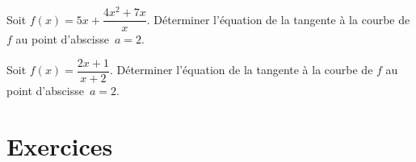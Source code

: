 \documentclass[10pt,a4paper,openany,twoside, eleve]{book}
\begin{document}
\begin{exon}
  Soit $f(x)\!=\!5x+\dfrac{4x^2+7x}{x}$.
  Déterminer l'équation de la tangente à la courbe de $f$ au point
  d'abscisse~$a\!=\!2$.

  \vspace{4mm}
\end{exon}


\begin{exon}
  Soit $f(x)\!=\!\dfrac{2x+1}{x+2}$.
  Déterminer l'équation de la tangente à la courbe de $f$ au point
  d'abscisse~$a\!=\!2$.
  
  \vspace{4mm}
\end{exon}



\newpage
\section{Exercices}
\end{document}
